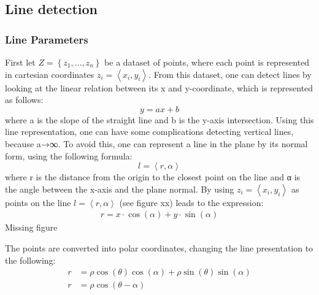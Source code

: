\documentclass[../Head/Main.tex]{subfiles}
\begin{document}
\subsection{Line detection}
\subsubsection{Line Parameters}
First let $Z = \left\{z_1, …, z_n\right\}$ be a dataset of points, where each point is represented in cartesian coordinates $z_i=\left\langle x_i, y_i \right\rangle$. From this dataset, one can detect lines by looking at the linear relation between its x and y-coordinate, which is represented as follows:
$$y = ax + b$$
where a is the slope of the straight line and b is the y-axis intersection. Using this line representation, one can have some complications detecting vertical lines, because a→∞. To avoid this, one can represent a line in the plane by its normal form, using the following formula:
$$l=\left\langle r, \alpha \right\rangle$$
where r is the distance from the origin to the closest point on the line and α is the angle between the x-axis and the plane normal. By using $z_i = \left\langle x_i,y_i \right\rangle$ as points on the line $l=\left\langle r, \alpha \right\rangle$ (see figure xx) leads to the expression:
\begin{align}
    r = x\cdot\cos(\alpha)+y\cdot\sin(\alpha)
\end{align}
{\color{red} Missing figure} \par
The points are converted into polar coordinates, changing the line presentation to the following:
\begin{align}
    r &= \rho\cos(\theta)\cos(\alpha)+\rho\sin(\theta)\sin(\alpha) \\
    r &= \rho\cos(\theta - \alpha)
\end{align}
\end{document}
